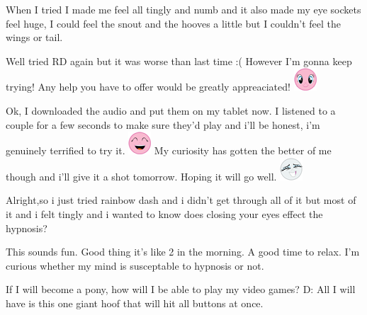 \documentclass[ebook,12pt,oneside,openany]{memoir}
\newcommand{\mytexttilde}{\raisebox{0.5ex}{\texttildelow}}
\begin{document}
\begin{tcolorbox}[title=GoldenShield]
\par{When I tried I made me feel all tingly and numb and it also made my eye sockets feel huge, I could feel the snout and the hooves a little but I couldn't feel the wings or tail.}
\end{tcolorbox}
\begin{tcolorbox}[title=Sanic Screwdriver]
\par{Well  tried RD again but it was worse than last time :( However I'm gonna keep trying! Any help you have to offer would be greatly appreaciated! \includegraphics{images/mlp_smile.png}}
\end{tcolorbox}
\begin{tcolorbox}[title=AngelofDeath]
\par{Ok, I downloaded the audio and put them on my tablet now. I listened to a couple for a few seconds to make sure they'd play and i'll be honest, i'm genuinely terrified to try it.  \includegraphics{images/mlp_laugh.png} My curiosity has gotten the better of me though and i'll give it a shot tomorrow. Hoping it will go well.  \includegraphics{images/mlp_8pfRZzv.png}}
\end{tcolorbox}
\begin{tcolorbox}[title=\mytexttilde{}TheStealthyPony\mytexttilde{},colback=yellow!5!white,colframe=yellow!75!black,coltitle=white]
\par{Alright,so i just tried rainbow dash and i didn't get through all of it but most of it and i felt tingly and i wanted to know does closing your eyes effect the hypnosis?}
\end{tcolorbox}
\begin{tcolorbox}[title=--Eve--]
\par{This sounds fun. Good thing it's like 2 in the morning. A good time to relax. I'm curious whether my mind is susceptable to hypnosis or not.}
\end{tcolorbox}
\begin{tcolorbox}[title=StormzInvader]
\par{If I will become a pony, how will I be able to play my video games? D: All I will have is this one giant hoof that will hit all buttons at once. }
\end{tcolorbox}
\end{document}
